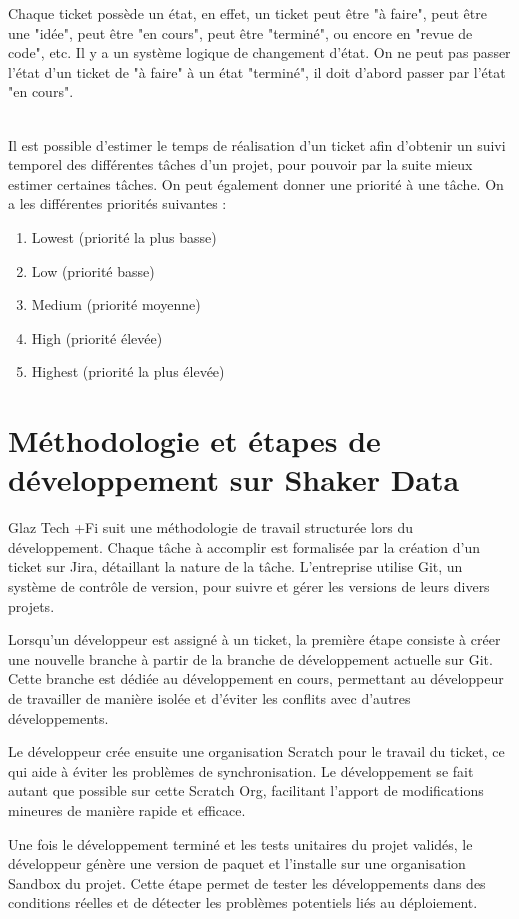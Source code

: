 \documentclass[12pt,oneside,noprintercorrection]{iut}
\begin{document}
Chaque ticket possède un état, en effet, un ticket peut être "à faire", peut être une "idée", peut être "en cours", peut être "terminé", ou encore en "revue de code", etc. Il y a un système logique de changement d'état. On ne peut pas passer l'état d'un ticket de "à faire" à un état "terminé", il doit d'abord passer par l'état "en cours".

~\\\indent Il est possible d'estimer le temps de réalisation d'un ticket afin d'obtenir un suivi temporel des différentes tâches d'un projet, pour pouvoir par la suite mieux estimer certaines tâches. On peut également donner une priorité à une tâche. On a les différentes priorités suivantes : 
\begin{enumerate}
    \item Lowest (priorité la plus basse)
    \item Low (priorité basse)
    \item Medium (priorité moyenne)
    \item High (priorité élevée)
    \item Highest (priorité la plus élevée)
\end{enumerate}

\clearpage
 
\section{Méthodologie et étapes de développement sur Shaker Data}
 Glaz Tech +Fi suit une méthodologie de travail structurée lors du développement. Chaque tâche à accomplir est formalisée par la création d'un ticket sur Jira, détaillant la nature de la tâche. L'entreprise utilise Git, un système de contrôle de version, pour suivre et gérer les versions de leurs divers projets.

Lorsqu'un développeur est assigné à un ticket, la première étape consiste à créer une nouvelle branche à partir de la branche de développement actuelle sur Git. Cette branche est dédiée au développement en cours, permettant au développeur de travailler de manière isolée et d'éviter les conflits avec d'autres développements.

Le développeur crée ensuite une organisation Scratch pour le travail du ticket, ce qui aide à éviter les problèmes de synchronisation. Le développement se fait autant que possible sur cette Scratch Org, facilitant l'apport de modifications mineures de manière rapide et efficace.

Une fois le développement terminé et les tests unitaires du projet validés, le développeur génère une version de paquet et l'installe sur une organisation Sandbox du projet. Cette étape permet de tester les développements dans des conditions réelles et de détecter les problèmes potentiels liés au déploiement.
\end{document}

